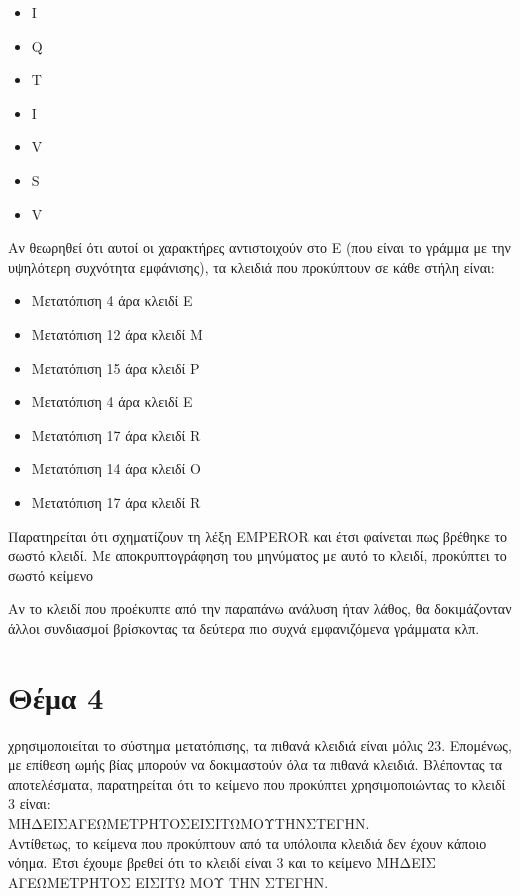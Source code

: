 \documentclass[a4paper, 11pt]{article}
\newcommand{\lt}{\latintext}
\newcommand\tab[1][1cm]{\hspace*{#1}}
\begin{document}
{\lt
\begin{itemize}
	\item I
	\item Q
	\item T
	\item I
	\item V
	\item S
	\item V
\end{itemize}
}

Αν θεωρηθεί ότι αυτοί οι χαρακτήρες αντιστοιχούν στο {\lt E} (που είναι το γράμμα με την υψηλότερη συχνότητα εμφάνισης), τα
κλειδιά που προκύπτουν σε κάθε στήλη είναι:

\begin{itemize}
	\item Μετατόπιση 4 άρα κλειδί {\lt E}
	\item Μετατόπιση 12 άρα κλειδί {\lt M}
	\item Μετατόπιση 15 άρα κλειδί {\lt P}
	\item Μετατόπιση 4 άρα κλειδί {\lt E}
	\item Μετατόπιση 17 άρα κλειδί {\lt R}
	\item Μετατόπιση 14 άρα κλειδί {\lt O}
	\item Μετατόπιση 17 άρα κλειδί {\lt R}
\end{itemize}

Παρατηρείται ότι σχηματίζουν τη λέξη {\lt EMPEROR} και έτσι φαίνεται πως βρέθηκε το σωστό κλειδί. Με αποκρυπτογράφηση του
μηνύματος με αυτό το κλειδί, προκύπτει το σωστό κείμενο

Αν το κλειδί που προέκυπτε από την παραπάνω ανάλυση ήταν λάθος, θα δοκιμάζονταν άλλοι συνδιασμοί βρίσκοντας τα δεύτερα πιο συχνά εμφανιζόμενα γράμματα κλπ.




\newpage


\section*{Θέμα 4}
 χρησιμοποιείται το σύστημα μετατόπισης, τα πιθανά κλειδιά είναι μόλις 23. Επομένως, με επίθεση ωμής βίας μπορούν να
δοκιμαστούν όλα τα πιθανά κλειδιά. Βλέποντας τα αποτελέσματα, παρατηρείται ότι το κείμενο που προκύπτει χρησιμοποιώντας το κλειδί 3 είναι:\\
ΜΗΔΕΙΣΑΓΕΩΜΕΤΡΗΤΟΣΕΙΣΙΤΩΜΟΥΤΗΝΣΤΕΓΗΝ.\\
Αντίθετως, το κείμενα που προκύπτουν από τα υπόλοιπα κλειδιά δεν έχουν κάποιο νόημα. Έτσι έχουμε βρεθεί ότι
το κλειδί είναι 3 και το κείμενο ΜΗΔΕΙΣ ΑΓΕΩΜΕΤΡΗΤΟΣ ΕΙΣΙΤΩ ΜΟΥ ΤΗΝ ΣΤΕΓΗΝ.\\
\end{document}
